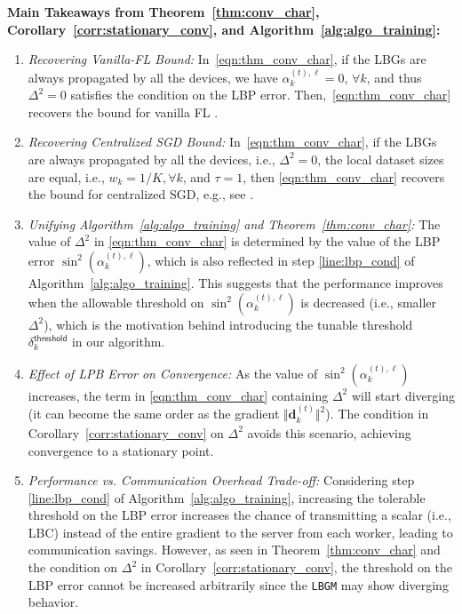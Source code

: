 \documentclass{article}
\renewcommand{\vec}[3]{\boldsymbol{#1}_{#2}^{#3}}
\newcommand{\subsup}[3]{#1_{#2}^{#3}}
\newcommand{\innorm}[2]{\Vert #1\Vert_{#2}}
\newcommand{\algName}{{\tt LBGM}}
\begin{document}
\textbf{Main Takeaways from Theorem~\ref{thm:conv_char}, Corollary~\ref{corr:stationary_conv}, and Algorithm~\ref{alg:algo_training}:} 
\vspace{-1mm}
\begin{enumerate}[leftmargin=5mm]
    \vspace{-0.25mm}
    \item \textit{Recovering Vanilla-FL Bound:} In~\eqref{eqn:thm_conv_char}, if the LBGs are always propagated by all the devices, we have $\subsup{\alpha}{k}{(t), \ell} = 0$, $\forall k$, and thus $\Delta^2 = 0$ satisfies the condition on the LBP error. Then,~\eqref{eqn:thm_conv_char} recovers the bound for vanilla FL \citep{wang2020tackling,stich2018local,wang2018cooperative}. 
    \vspace{-0.25mm}
    \item \textit{Recovering Centralized SGD Bound:} In~\eqref{eqn:thm_conv_char}, if the LBGs are always propagated by all the devices, i.e., $\Delta^2 = 0$, the local dataset sizes are equal, i.e., $w_k=1/K, \forall k$, and $\tau=1$, then \eqref{eqn:thm_conv_char} recovers the bound for centralized SGD, e.g., see \citet{friedlander2012hybrid}.
    \vspace{-0.25mm}
    \item \textit{Unifying Algorithm~\ref{alg:algo_training} and Theorem~\ref{thm:conv_char}:}\label{tk:3} The value of $\Delta^2$ in \eqref{eqn:thm_conv_char} is determined by the value of the LBP error $\sin^2(\subsup{\alpha}{k}{(t),\ell})$, which is also reflected in step \ref{line:lbp_cond} of Algorithm~\ref{alg:algo_training}. This suggests that the performance improves when the allowable threshold on $\sin^2(\subsup{\alpha}{k}{(t),\ell})$ is decreased (i.e., smaller $\Delta^2$), which is the motivation behind introducing the tunable threshold $\subsup{\delta}{k}{\mathsf{threshold}}$ in our algorithm.
    \vspace{-0.25mm}
    \item \textit{Effect of LPB Error on Convergence:} As the value of $\sin^2(\subsup{\alpha}{k}{(t),\ell})$ increases, the term in \eqref{eqn:thm_conv_char} containing $\Delta^2$ will start diverging (it can become the same order as the gradient $\innorm{\vec{d}{k}{(t)}}{}^2$). The condition in Corollary~\ref{corr:stationary_conv} on $\Delta^2$ avoids this scenario, achieving convergence to a stationary point. 
    \vspace{-0.3mm}
    \item \textit{Performance vs. Communication Overhead Trade-off:}\label{tk:5} Considering step \ref{line:lbp_cond} of Algorithm~\ref{alg:algo_training}, increasing the tolerable threshold on the LBP error increases the chance of transmitting a scalar (i.e., LBC) instead of the entire gradient to the server from each worker, leading to communication savings. However, as seen in Theorem~\ref{thm:conv_char} and the condition on $\Delta^2$ in Corollary~\ref{corr:stationary_conv}, the threshold on the LBP error cannot be increased arbitrarily since the {\algName} may show diverging behavior. 
\end{enumerate}
\end{document}

